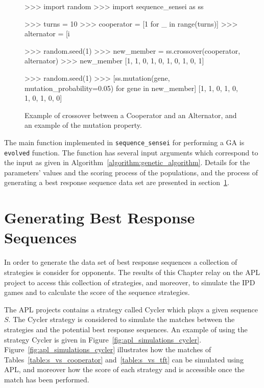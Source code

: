 \begin{figure}[!htbp]
\begin{usagepy}
>>> import random
>>> import sequence_sensei as ss

>>> turns = 10
>>> cooperator = [1 for _ in range(turns)]
>>> alternator = [i %

>>> random.seed(1)
>>> new_member = ss.crossover(cooperator, alternator)
>>> new_member
[1, 1, 0, 1, 0, 1, 0, 1, 0, 1]

>>> random.seed(1)
>>> [ss.mutation(gene, mutation_probability=0.05) for gene in new_member]
[1, 1, 0, 1, 0, 1, 0, 1, 0, 0]

\end{usagepy}
\caption{Example of crossover between a Cooperator and an Alternator, and an example
of the mutation property.}\label{fig:crossover_mutation}
\end{figure}

The main function implemented in \texttt{sequence_sensei} for
performing a GA is \texttt{evolved} function. The function has
several input arguments which correspond to the input as given in
Algorithm~\ref{algorithm:genetic_algorithm}. Details for the parameters' values
and the scoring process of the populations, and the process of generating a best
response sequence data set are presented in
section~\ref{section:generating_sequences}.

\section{Generating Best Response Sequences}\label{section:generating_sequences}

In order to generate the data set of best response sequences a collection of
\numberofstrategiesbestsequences strategies is consider for opponents. The
results of this Chapter relay on the APL project to access this collection of
strategies, and moreover, to simulate the IPD games and to calculate the score
of the sequence strategies.

The APL projects contains a strategy called Cycler which plays a given sequence
\(S\). The Cycler strategy is considered to simulate the matches between the
\numberofstrategiesbestsequences strategies and the potential best response
sequences. An example of using the strategy Cycler is given in
Figure~\ref{fig:apl_simulations_cycler}. Figure~\ref{fig:apl_simulations_cycler}
illustrates how the matches of Tables~\ref{table:s_vs_cooperator}
and~\ref{table:s_vs_tft} can be simulated using APL, and moreover how the score
of each strategy and is accessible once the match has been performed.

